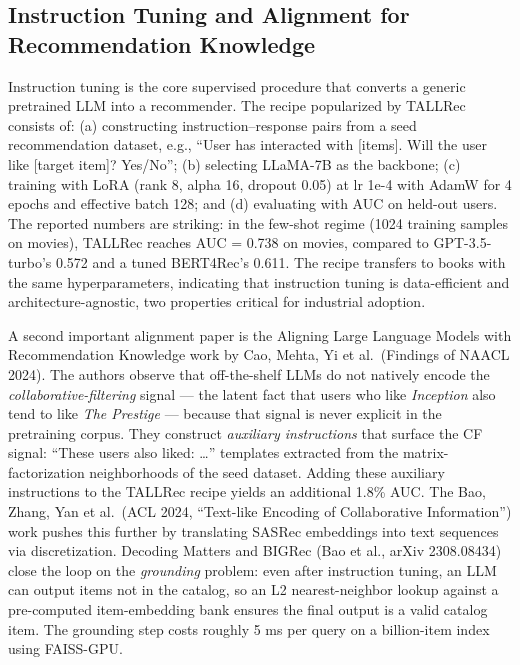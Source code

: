 \documentclass{article}
\begin{document}
\subsection{Instruction Tuning and Alignment for Recommendation Knowledge}\label{instruction-tuning-and-alignment-for-recommendation-knowledge}

Instruction tuning is the core supervised procedure that converts a generic pretrained LLM into a recommender. The recipe popularized by TALLRec \citep{bao2023arxiv2305004472023} consists of: (a) constructing instruction--response pairs from a seed recommendation dataset, e.g., ``User has interacted with {[}items{]}. Will the user like {[}target item{]}? Yes/No''; (b) selecting LLaMA-7B as the backbone; (c) training with LoRA (rank 8, alpha 16, dropout 0.05) at lr 1e-4 with AdamW for 4 epochs and effective batch 128; and (d) evaluating with AUC on held-out users. The reported numbers are striking: in the few-shot regime (1024 training samples on movies), TALLRec reaches AUC = 0.738 on movies, compared to GPT-3.5-turbo's 0.572 and a tuned BERT4Rec's 0.611. The recipe transfers to books with the same hyperparameters, indicating that instruction tuning is data-efficient and architecture-agnostic, two properties critical for industrial adoption.

A second important alignment paper is the Aligning Large Language Models with Recommendation Knowledge work by Cao, Mehta, Yi et al.~(Findings of NAACL 2024). The authors observe that off-the-shelf LLMs do not natively encode the \emph{collaborative-filtering} signal --- the latent fact that users who like \emph{Inception} also tend to like \emph{The Prestige} --- because that signal is never explicit in the pretraining corpus. They construct \emph{auxiliary instructions} that surface the CF signal: ``These users also liked: \ldots{}'' templates extracted from the matrix-factorization neighborhoods of the seed dataset. Adding these auxiliary instructions to the TALLRec recipe yields an additional 1.8\% AUC. The Bao, Zhang, Yan et al.~(ACL 2024, ``Text-like Encoding of Collaborative Information'') work pushes this further by translating SASRec embeddings into text sequences via discretization. Decoding Matters \citep{bao2024decodingmattersadd} and BIGRec (Bao et al., arXiv 2308.08434) close the loop on the \emph{grounding} problem: even after instruction tuning, an LLM can output items not in the catalog, so an L2 nearest-neighbor lookup against a pre-computed item-embedding bank ensures the final output is a valid catalog item. The grounding step costs roughly 5 ms per query on a billion-item index using FAISS-GPU.
\end{document}
